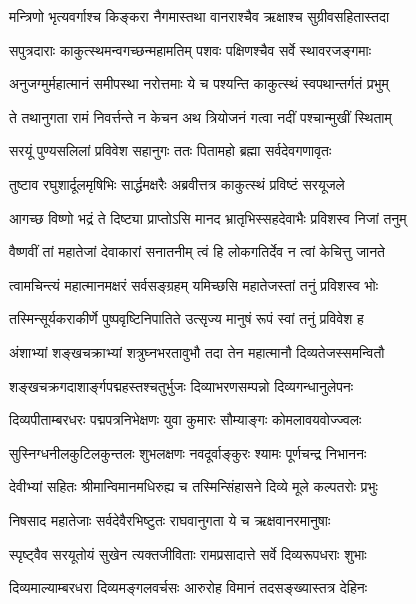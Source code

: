 \twolineshloka
{मन्त्रिणो भृत्यवर्गाश्च किङ्करा नैगमास्तथा}
{वानराश्चैव ऋक्षाश्च सुग्रीवसहितास्तदा}%

\twolineshloka
{सपुत्रदाराः काकुत्स्थमन्वगच्छन्महामतिम्}
{पशवः पक्षिणश्चैव सर्वे स्थावरजङ्गमाः}%

\twolineshloka
{अनुजग्मुर्महात्मानं समीपस्था नरोत्तमाः}
{ये च पश्यन्ति काकुत्स्थं स्वपथान्तर्गतं प्रभुम्}%

\twolineshloka
{ते तथानुगता रामं निवर्त्तन्ते न केचन}
{अथ त्रियोजनं गत्वा नदीं पश्चान्मुखीं स्थिताम्}%

\twolineshloka
{सरयूं पुण्यसलिलां प्रविवेश सहानुगः}
{ततः पितामहो ब्रह्मा सर्वदेवगणावृतः}%

\twolineshloka
{तुष्टाव रघुशार्दूलमृषिभिः सार्द्धमक्षरैः}
{अब्रवीत्तत्र काकुत्स्थं प्रविष्टं सरयूजले}%


\twolineshloka
{आगच्छ विष्णो भद्रं ते दिष्ट्या प्राप्तोऽसि मानद}
{भ्रातृभिस्सहदेवाभैः प्रविशस्व निजां तनुम्}%

\twolineshloka
{वैष्णवीं तां महातेजां देवाकारां सनातनीम्}
{त्वं हि लोकगतिर्देव न त्वां केचित्तु जानते}%

\twolineshloka
{त्वामचिन्त्यं महात्मानमक्षरं सर्वसङ्ग्रहम्}
{यमिच्छसि महातेजस्तां तनुं प्रविशस्व भोः}%


\twolineshloka
{तस्मिन्सूर्यकराकीर्णे पुष्पवृष्टिनिपातिते}
{उत्सृज्य मानुषं रूपं स्वां तनुं प्रविवेश ह}%

\twolineshloka
{अंशाभ्यां शङ्खचक्राभ्यां शत्रुघ्नभरतावुभौ}
{तदा तेन महात्मानौ दिव्यतेजस्समन्वितौ}%

\twolineshloka
{शङ्खचक्रगदाशार्ङ्गपद्महस्तश्चतुर्भुजः}
{दिव्याभरणसम्पन्नो दिव्यगन्धानुलेपनः}%

\twolineshloka
{दिव्यपीताम्बरधरः पद्मपत्रनिभेक्षणः}
{युवा कुमारः सौम्याङ्गः कोमलावयवोज्ज्वलः}%

\twolineshloka
{सुस्निग्धनीलकुटिलकुन्तलः शुभलक्षणः}
{नवदूर्वाङ्कुरः श्यामः पूर्णचन्द्र निभाननः}%

\twolineshloka
{देवीभ्यां सहितः श्रीमान्विमानमधिरुह्य च}
{तस्मिन्सिंहासने दिव्ये मूले कल्पतरोः प्रभुः}%

\twolineshloka
{निषसाद महातेजाः सर्वदेवैरभिष्टुतः}
{राघवानुगता ये च ऋक्षवानरमानुषाः}%

\twolineshloka
{स्पृष्ट्वैव सरयूतोयं सुखेन त्यक्तजीविताः}
{रामप्रसादात्ते सर्वे दिव्यरूपधराः शुभाः}%

\twolineshloka
{दिव्यमाल्याम्बरधरा दिव्यमङ्गलवर्चसः}
{आरुरोह विमानं तदसङ्ख्यास्तत्र देहिनः}%

